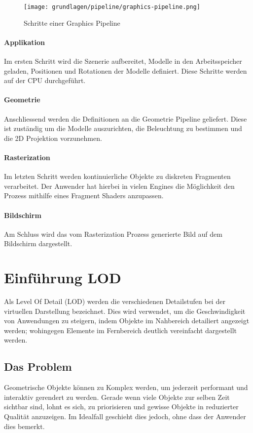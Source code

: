 \begin{figure}[H]
  \centering
  \texttt{[image: grundlagen/pipeline/graphics-pipeline.png]}
  \caption{Schritte einer Graphics Pipeline}
  \label{fig:renderingPipelineOverview}
\end{figure}

\paragraph{Applikation}
Im ersten Schritt wird die Szenerie aufbereitet, Modelle in den Arbeitsspeicher geladen, Positionen und Rotationen der Modelle definiert. Diese Schritte werden auf der CPU durchgeführt.

\paragraph{Geometrie}
Anschliessend werden die Definitionen an die Geometrie Pipeline geliefert. Diese ist zuständig um die Modelle auszurichten, die Beleuchtung zu bestimmen und die 2D Projektion vorzunehmen.

\paragraph{Rasterization}
Im letzten Schritt werden kontinuierliche Objekte zu diskreten Fragmenten verarbeitet. Der Anwender hat hierbei in vielen Engines die Möglichkeit den Prozess mithilfe eines Fragment Shaders anzupassen.

\paragraph{Bildschirm}
Am Schluss wird das vom Rasterization Prozess generierte Bild auf dem Bildschirm dargestellt.

\section{Einführung LOD}
Als Level Of Detail (LOD) werden die verschiedenen Detailstufen bei der virtuellen Darstellung bezeichnet.
Dies wird verwendet, um die Geschwindigkeit von Anwendungen zu steigern, indem Objekte im Nahbereich detailiert angezeigt werden; wohingegen Elemente im Fernbereich deutlich vereinfacht dargestellt werden.

\subsection{Das Problem}
Geometrische Objekte können zu Komplex werden, um jederzeit performant und interaktiv gerendert zu werden.
Gerade wenn viele Objekte zur selben Zeit sichtbar sind, lohnt es sich, zu priorisieren und gewisse Objekte in reduzierter Qualität anzuzeigen.
Im Idealfall geschieht dies jedoch, ohne dass der Anwender dies bemerkt.

